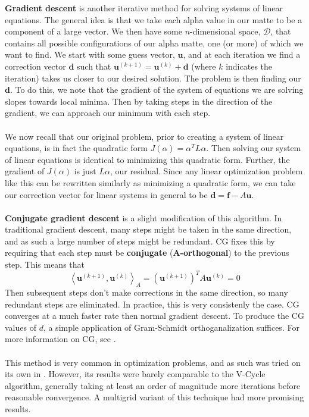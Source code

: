 \textbf{Gradient descent} is another iterative method for solving systems of linear equations. The general idea is that we take each alpha value in our matte to be a component of a large vector. We then have some $n$-dimensional space, $\mathcal{D}$, that contains all possible configurations of our alpha matte, one (or more) of which we want to find. We start with some guess vector, $\textbf{u}$, and at each iteration we find a correction vector $\textbf{d}$ such that $\textbf{u}^{(k+1)} = \textbf{u}^{(k)}+\textbf{d}$ (where $k$ indicates the iteration) takes us closer to our desired solution. The problem is then finding our $\textbf{d}$. To do this, we note that the gradient of the system of equations we are solving slopes towards local minima. Then by taking steps in the direction of the gradient, we can approach our minimum with each step.
\\\\
We now recall that our original problem, prior to creating a system of linear equations, is in fact the quadratic form $J(\alpha)=\alpha^TL\alpha$. Then solving our system of linear equations is identical to minimizing this quadratic form. Further, the gradient of $J(\alpha)$ is just $L\alpha$, our residual. Since any linear optimization problem like this can be rewritten similarly as minimizing a quadratic form, we can take our correction vector for linear systems in general to be $\textbf{d}=\textbf{f}-A\textbf{u}$.
\\\\
\textbf{Conjugate gradient descent} is a slight modification of this algorithm. In traditional gradient descent, many steps might be taken in the same direction, and as such a large number of steps might be redundant. CG fixes this by requiring that each step must be \textbf{conjugate} (\textbf{A-orthogonal}) to the previous step. This means that
\[\left\langle \textbf{u}^{(k+1)},\textbf{u}^{(k)}\right\rangle_A = \left(\textbf{u}^{(k+1)}\right)^TA\textbf{u}^{(k)}=0\]
Then subsequent steps don't make corrections in the same direction, so many redundant steps are eliminated. In practice, this is very consistenly the case. CG converges at a much faster rate then normal gradient descent. To produce the CG values of $d$, a simple application of Gram-Schmidt orthoganalization suffices. For more information on CG, see \cite{shewchuk94}.
\\\\
This method is very common in optimization problems, and as such was tried on its own in \cite{lee14}. However, its results were barely comparable to the V-Cycle algorithm, generally taking at least an order of magnitude more iterations before reasonable convergence. A multigrid variant of this technique had more promising results.